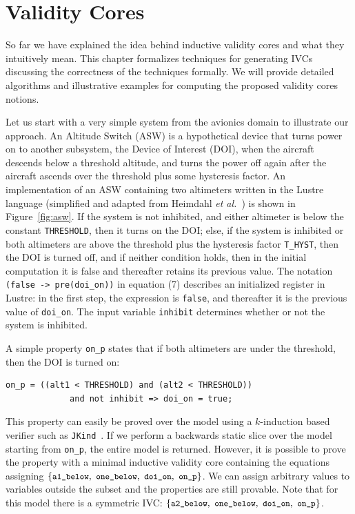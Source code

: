 \chapter{Validity Cores}
\label{ch:ivc}

So far we have explained the idea behind inductive validity cores and what they intuitively mean. This chapter formalizes techniques for generating IVCs discussing the correctness of the techniques formally. We will provide detailed algorithms and illustrative examples for computing the proposed validity cores notions.

Let us start with a very simple system from the avionics domain to illustrate our approach. An Altitude Switch (ASW) is a hypothetical device that turns power on to another subsystem, the Device of Interest (DOI), when the aircraft descends below a threshold altitude, and turns the power off again after the aircraft ascends over the threshold plus some hysteresis factor.  An implementation of an ASW containing two altimeters written in the Lustre language (simplified and adapted from Heimdahl \textit{et al.}~\cite{HCW02:ase-deviation}) is shown in Figure~\ref{fig:asw}.  If the system is not inhibited, and either altimeter is below the constant {\small \texttt{THRESHOLD}}, then it turns on the DOI; else, if the system is inhibited or both altimeters are above the threshold plus the hysteresis factor {\small \texttt{T\_HYST}}, then the DOI is turned off, and if neither condition holds, then in the initial computation it is false and thereafter retains its previous value.  The notation {\small \texttt{(false -> pre(doi\_on))}} in equation (7) describes an initialized register in Lustre: in the first step, the expression is {\small \texttt{false}}, and thereafter it is the previous value of {\small \texttt{doi\_on}}. The input variable {\small\texttt{inhibit}} determines whether or not the system is inhibited.

A simple property {\small \texttt{on\_p}} states that if both altimeters are under the threshold, then the DOI is turned on:
{\smaller
\begin{verbatim}
on_p = ((alt1 < THRESHOLD) and (alt2 < THRESHOLD))
             and not inhibit => doi_on = true;
\end{verbatim}
}
\noindent This property can easily be proved over the model using a $k$-induction based verifier such as \texttt{JKind}~\cite{jkind}.
If we perform a backwards static slice over the model starting from {\small \texttt{on\_p}}, the entire model is returned.  However, it is possible to prove the property with a minimal inductive validity core containing the equations assigning $\{ { \small \texttt{a1\_below},~\texttt{one\_below}, ~\texttt{doi\_on},~\texttt{on\_p}}\}$. We can assign arbitrary values to variables outside the subset and the properties are still provable.  Note that for this model there is a symmetric IVC: $\{ {\small \texttt{a2\_below},~\texttt{one\_below}, ~\texttt{doi\_on},~\texttt{on\_p}}\}$.

